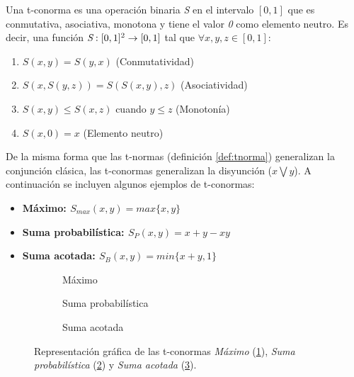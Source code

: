 \begin{definition}
Una t-conorma es una operación binaria \emph{S} en el intervalo $[0,1]$ que es conmutativa, asociativa, monotona y tiene el valor \emph{0} como elemento neutro. Es decir, una función $\emph{S} : [0,1]^2 \rightarrow [0,1]$ tal que $\forall x,y,z \in [0,1]$:
\begin{enumerate}[label=(S\arabic*),ref=(S\arabic*)]
   \item $S(x,y) = S(y,x)$ (Conmutatividad)\label{S1}
   \item $S(x,S(y,z)) = S(S(x,y),z)$ (Asociatividad)\label{S2}
   \item $S(x,y) \leq S(x,z)$ cuando $y \leq z$ (Monotonía)\label{S3}
   \item $S(x,0) = x$ (Elemento neutro)\label{S4}
  \end{enumerate}
\end{definition}
De la misma forma que las t-normas (definición \ref{def:tnorma}) generalizan la conjunción clásica, las t-conormas generalizan la disyunción ($x\bigvee y$). A continuación se incluyen algunos ejemplos de t-conormas:
\begin{itemize}
	\item \bfseries Máximo: $S_{max}(x,y) = max\{x,y\}$
	\item \bfseries Suma probabilística: $S_{P}(x,y) = x + y - xy$
	\item \bfseries Suma acotada: $S_{B}(x,y) = min\{x+y,1\}$
\end{itemize}
\begin{figure}[H]
	\centering
	\begin{subfigure}[b]{0.45\textwidth}
		\setlength\figureheight{4.5cm}
		\setlength\figurewidth{6cm}
		
		\caption{Máximo}
		\label{fig:t-conorms-max}
	\end{subfigure}
	\qquad
	\begin{subfigure}[b]{0.45\textwidth}
		\setlength\figureheight{4.5cm}
		\setlength\figurewidth{6cm}
		
		\caption{Suma probabilística}
		\label{fig:t-conorms-probabilistic-sum}
	\end{subfigure}
	
	\vspace{1 cm}
	\begin{subfigure}[b]{0.45\textwidth}
		\setlength\figureheight{4.5cm}
		\setlength\figurewidth{6cm}
		
		\caption{Suma acotada}
		\label{fig:t-conorms-bounded-sum}
	\end{subfigure}
	\label{fig:t-conorms}
	\caption{Representación gráfica de las t-conormas \emph{Máximo} (\ref{fig:t-conorms-max}), \emph{Suma probabilística} (\ref{fig:t-conorms-probabilistic-sum}) y \emph{Suma acotada} (\ref{fig:t-conorms-bounded-sum}).}
\end{figure}
